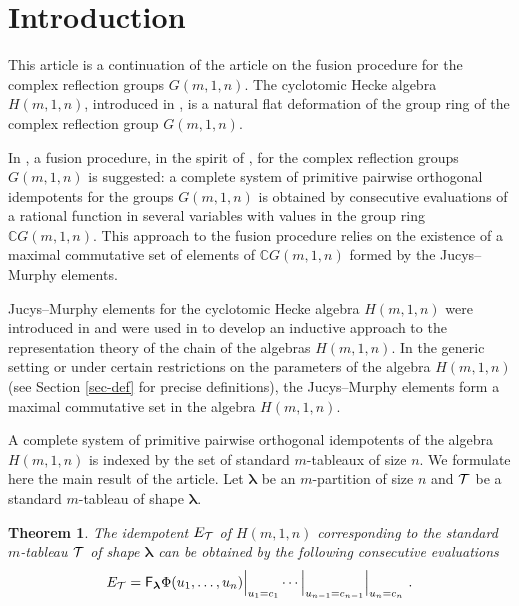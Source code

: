 \documentclass[pdftex]{sigma}
\newcommand{\C}{\mathbb{C}}
\newcommand{\lam}{\boldsymbol{\lambda}}
\newtheorem*{theo-intro}{Theorem}
\begin{document}

\renewcommand{\thefootnote}{\arabic{footnote}}
\setcounter{footnote}{0}

\section{Introduction}

This article is a continuation of the article \cite{OPdA} on the fusion procedure for the complex ref\/lection groups $G(m,1,n)$.
The cyclotomic Hecke algebra $H(m,1,n)$, introduced in \cite{AK,Bro-M,C2}, is a natural f\/lat
deformation of the group ring of the complex ref\/lection group $G(m,1,n)$.

In \cite{OPdA}, a fusion procedure, in the spirit of \cite{Mo}, for the complex ref\/lection groups $G(m,1,n)$ is suggested:
a complete system of primitive pairwise orthogonal idempotents for the groups $G(m,1,n)$ is obtained by consecutive evaluations of a rational function in several variables with values in the group ring $\C G(m,1,n)$. This approach to the fusion procedure relies on the existence of a maximal commutative set of elements of $\C G(m,1,n)$ formed by the Jucys--Murphy elements.

Jucys--Murphy elements for the cyclotomic Hecke algebra $H(m,1,n)$ were introduced in \cite{AK} and were used in \cite{OPdA1} to develop an inductive approach to the representation theory of the chain of the algebras $H(m,1,n)$. In the generic setting
or under certain restrictions on the parameters of the algebra $H(m,1,n)$
(see Section \ref{sec-def} for precise def\/initions), the Jucys--Murphy elements form a maximal commutative set in the algebra $H(m,1,n)$.


A complete system of primitive pairwise orthogonal idempotents of the algebra $H(m,1,n)$ is indexed by the set of standard $m$-tableaux of size $n$. We formulate here the main result of the article.
Let $\lam$ be an $m$-partition of size $n$ and ${\cal{T}}$ be a standard $m$-tableau of shape $\lam$.

\begin{theo-intro}\label{prop-fus1-intro}
The idempotent $E_{{\cal{T}}}$ of $H(m,1,n)$
corresponding to the standard $m$-tableau ${\cal{T}}$ of shape $\lam$ can be obtained by the following consecutive evaluations
\begin{gather}\label{eq-idem-fin1-intro}
E_{{\cal{T}}}=\mathsf{F}_{\lam}\Phi(u_1,\dots,u_{n})\Bigr\rvert_{u_1=c_1}\cdots\Bigr\rvert_{u_{n-1}=c_{n-1}}\Bigr\rvert_{u_{n}=c_{n}}\ .
\end{gather}
\end{theo-intro}
\end{document}
